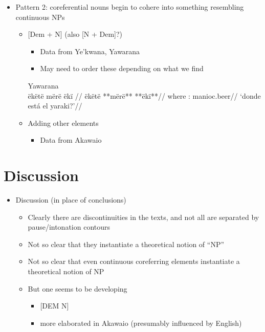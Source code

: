 \documentclass[10pt]{article}
\begin{document}
\begin{itemize}
\tightlist
\item
  Pattern 2: coreferential nouns begin to cohere into something
  resembling continuous NPs

  \begin{itemize}
  \tightlist
  \item
    {[}Dem + N{]} (also {[}N + Dem{]}?)

    \begin{itemize}
    \tightlist
    \item
      Data from Ye'kwana, Yawarana
    \item
      May need to order these depending on what we find
    \end{itemize}

    \ex Yawarana \parencite{caceres2020flex} \\
    \label{ctorat-34}    \begingl
      \glpreamble ëkëtë mërë ëkï //
      \gla ëkëtë **mërë** **ëkï**//
      \glb where : manioc.beer//
       \glft ‘donde está el yaraki?’//  
      \endgl 
    \xe
  \item
    Adding other elements

    \begin{itemize}
    \tightlist
    \item
      Data from Akawaio
    \end{itemize}
  \end{itemize}
\end{itemize}

\section{Discussion}

\begin{itemize}
\tightlist
\item
  Discussion (in place of conclusions)

  \begin{itemize}
  \tightlist
  \item
    Clearly there are discontinuities in the texts, and not all are
    separated by pause/intonation contours
  \item
    Not so clear that they instantiate a theoretical notion of ``NP''
  \item
    Not so clear that even continuous coreferring elements instantiate a
    theoretical notion of NP
  \item
    But one seems to be developing

    \begin{itemize}
    \tightlist
    \item
      {[}DEM N{]}
    \item
      more elaborated in Akawaio (presumably influenced by English)
    \end{itemize}
  \end{itemize}
\end{itemize}

\printbibliography
\end{document}
